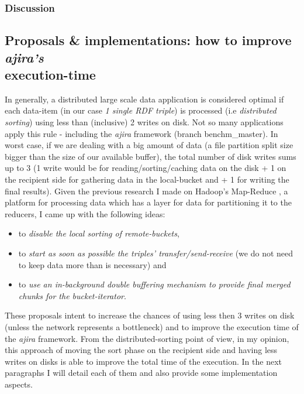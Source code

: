 % 
\subsubsection*{Discussion}

% 
\subsection{Proposals \& implementations: how to improve \textit{ajira's} \\ execution-time}

In generally, a distributed large scale data application is considered optimal if each data-item (in our case \textit{1 single RDF triple}) is processed (i.e \textit{distributed sorting}) using less than (inclusive) 2 writes on disk. Not so many applications apply this rule - including the \textit{ajira} framework (branch benchm\_master). In worst case, if we are dealing with a big amount of data (a file partition split size bigger than the size of our available buffer), the total number of disk writes sums up to 3 (1 write would be for reading/sorting/caching data on the disk + 1 on the recipient side for gathering data in the local-bucket and + 1 for writing the final results). Given the previous research I made on Hadoop's Map-Reduce \cite{hadoop}, a platform for processing data which has a layer for data \cite{shuffling} for partitioning it to the reducers, I came up with the following ideas: 
\begin{itemize}
\item to \textit{disable the local sorting of remote-buckets},
\item to \textit{start as soon as possible the triples' transfer/send-receive} (we do not need to keep data more than is necessary) and
\item to \textit{use an in-background double buffering mechanism to provide final merged chunks for the bucket-iterator}. 
\end{itemize}
  
These proposals intent to increase the chances of using less then 3 writes on disk (unless the network represents a bottleneck) and to improve the execution time of the \textit{ajira} framework. From the distributed-sorting point of view, in my opinion, this approach of moving the sort phase on the recipient side and having less writes on disks is able to improve the total time of the execution. In the next paragraphs I will detail each of them and also provide some implementation aspects.

